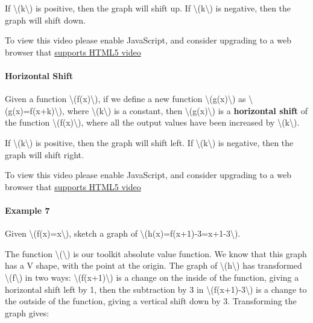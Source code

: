 If \textbackslash{}(k\textbackslash{}) is positive, then the graph will
shift up. If \textbackslash{}(k\textbackslash{}) is negative, then the
graph will shift down.

To view this video please enable JavaScript, and consider upgrading to a
web browser that \href{http://videojs.com/html5-video-support/}{supports
HTML5 video}

\hypertarget{horizontal-shift}{%
\paragraph{Horizontal Shift}\label{horizontal-shift}}

Given a function \textbackslash{}(f(x)\textbackslash{}), if we define a
new function \textbackslash{}(g(x)\textbackslash{}) as
\textbackslash{}(g(x)=f(x+k)\textbackslash{}), where
\textbackslash{}(k\textbackslash{}) is a constant, then
\textbackslash{}(g(x)\textbackslash{}) is a \textbf{horizontal shift} of
the function \textbackslash{}(f(x)\textbackslash{}), where all the
output values have been increased by
\textbackslash{}(k\textbackslash{}).

If \textbackslash{}(k\textbackslash{}) is positive, then the graph will
shift left. If \textbackslash{}(k\textbackslash{}) is negative, then the
graph will shift right.

To view this video please enable JavaScript, and consider upgrading to a
web browser that \href{http://videojs.com/html5-video-support/}{supports
HTML5 video}

\hypertarget{example-7}{%
\paragraph{Example 7}\label{example-7}}

Given \textbackslash{}(f(x)=\textbar{}x\textbar{}\textbackslash{}),
sketch a graph of
\textbackslash{}(h(x)=f(x+1)-3=\textbar{}x+1\textbar{}-3\textbackslash{}).

The function \textbackslash{}(\textbackslash{}) is our toolkit absolute
value function. We know that this graph has a V shape, with the point at
the origin. The graph of \textbackslash{}(h\textbackslash{}) has
transformed \textbackslash{}(f\textbackslash{}) in two ways:
\textbackslash{}(f(x+1)\textbackslash{}) is a change on the inside of
the function, giving a horizontal shift left by 1, then the subtraction
by 3 in \textbackslash{}(f(x+1)-3\textbackslash{}) is a change to the
outside of the function, giving a vertical shift down by 3. Transforming
the graph gives:

